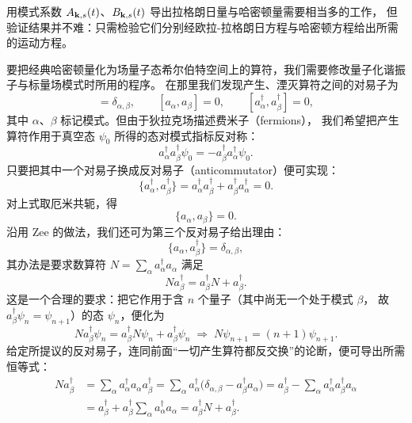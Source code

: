 用模式系数 $A_{\mathbf{k},s}(t)$、$B_{\mathbf{k},s}(t)$ 导出拉格朗日量与哈密顿量需要相当多的工作，
但验证结果并不难：只需检验它们分别经欧拉-拉格朗日方程与哈密顿方程给出所需的运动方程。

要把经典哈密顿量化为场量子态希尔伯特空间上的算符，我们需要修改量子化谐振子与标量场模式时所用的程序。
在那里我们发现产生、湮灭算符之间的对易子为
\begin{equation*}
[a_{\alpha},a^{\dagger}_{\beta}]=\delta_{\alpha,\beta},\qquad
[a_{\alpha},a_{\beta}]=0,\qquad
[a^{\dagger}_{\alpha},a^{\dagger}_{\beta}]=0,
\end{equation*}
其中 $\alpha$、$\beta$ 标记模式。但由于狄拉克场描述费米子（fermions），
我们希望把产生算符作用于真空态 $\psi_{0}$ 所得的态对模式指标反对称：
\begin{equation*}
a^{\dagger}_{\alpha}a^{\dagger}_{\beta}\psi_{0}=-a^{\dagger}_{\beta}a^{\dagger}_{\alpha}\psi_{0}.
\end{equation*}
只要把其中一个对易子换成反对易子（anticommutator）便可实现：
\begin{equation*}
\{a^{\dagger}_{\alpha},a^{\dagger}_{\beta}\}
=a^{\dagger}_{\alpha}a^{\dagger}_{\beta}+a^{\dagger}_{\beta}a^{\dagger}_{\alpha}=0 .
\end{equation*}
对上式取厄米共轭，得
\begin{equation*}
\{a_{\alpha},a_{\beta}\}=0 .
\end{equation*}
沿用 Zee 的做法，我们还可为第三个反对易子给出理由：
\begin{equation*}
\{a_{\alpha},a^{\dagger}_{\beta}\}=\delta_{\alpha,\beta},
\end{equation*}
其办法是要求数算符 $N=\sum_{\alpha}a^{\dagger}_{\alpha}a_{\alpha}$ 满足
\begin{equation*}
N a^{\dagger}_{\beta}=a^{\dagger}_{\beta}N+a^{\dagger}_{\beta}.
\end{equation*}
这是一个合理的要求：把它作用于含 $n$ 个量子（其中尚无一个处于模式 $\beta$，
故 $a^{\dagger}_{\beta}\psi_{n}=\psi_{n+1}$）的态 $\psi_{n}$，便化为
\begin{equation*}
N a^{\dagger}_{\beta}\psi_{n}=a^{\dagger}_{\beta}N\psi_{n}+a^{\dagger}_{\beta}\psi_{n}
\;\Longrightarrow\;
N\psi_{n+1}=(n+1)\psi_{n+1}.
\end{equation*}
给定所提议的反对易子，连同前面“一切产生算符都反交换”的论断，便可导出所需恒等式：
\begin{align*}
N a^{\dagger}_{\beta}
&=\sum_{\alpha}a^{\dagger}_{\alpha}a_{\alpha}a^{\dagger}_{\beta}
=\sum_{\alpha}a^{\dagger}_{\alpha}\bigl(\delta_{\alpha,\beta}-a^{\dagger}_{\beta}a_{\alpha}\bigr)
=a^{\dagger}_{\beta}-\sum_{\alpha}a^{\dagger}_{\alpha}a^{\dagger}_{\beta}a_{\alpha}\\
&=a^{\dagger}_{\beta}+a^{\dagger}_{\beta}\sum_{\alpha}a^{\dagger}_{\alpha}a_{\alpha}
=a^{\dagger}_{\beta}N+a^{\dagger}_{\beta}.
\end{align*}

